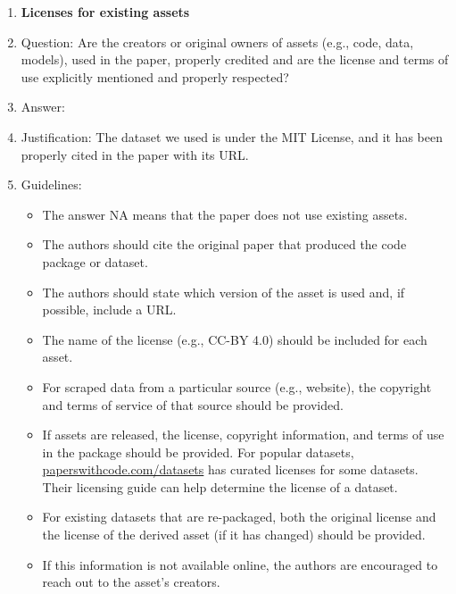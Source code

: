 \documentclass{article}
\begin{document}
\begin{enumerate}
\item {\bf Licenses for existing assets}
    \item[] Question: Are the creators or original owners of assets (e.g., code, data, models), used in the paper, properly credited and are the license and terms of use explicitly mentioned and properly respected?
    \item[] Answer: \answerYes{} %
    \item[] Justification: The dataset we used is under the MIT License, and it has been properly cited in the paper with its URL.
    \item[] Guidelines:
    \begin{itemize}
        \item The answer NA means that the paper does not use existing assets.
        \item The authors should cite the original paper that produced the code package or dataset.
        \item The authors should state which version of the asset is used and, if possible, include a URL.
        \item The name of the license (e.g., CC-BY 4.0) should be included for each asset.
        \item For scraped data from a particular source (e.g., website), the copyright and terms of service of that source should be provided.
        \item If assets are released, the license, copyright information, and terms of use in the package should be provided. For popular datasets, \url{paperswithcode.com/datasets} has curated licenses for some datasets. Their licensing guide can help determine the license of a dataset.
        \item For existing datasets that are re-packaged, both the original license and the license of the derived asset (if it has changed) should be provided.
        \item If this information is not available online, the authors are encouraged to reach out to the asset's creators.
    \end{itemize}


\end{enumerate}
\end{document}
